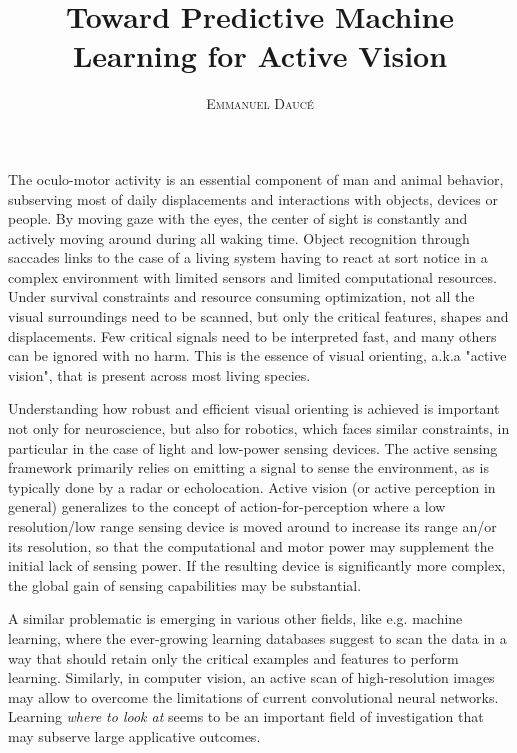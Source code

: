 \documentclass[12pt,twoside,openright]{article}
\title{\textbf{Toward Predictive Machine Learning for Active Vision} }
\author{\textsc{Emmanuel Daucé}}%
\date{}
\begin{document}
	
\maketitle
	
	The oculo-motor activity is an essential component of man and animal behavior, subserving most of daily displacements and interactions with objects, devices or people. By moving gaze with the eyes, the center of sight is constantly and actively moving around during all waking time.  %
	Object recognition through saccades links to the case of a living system having to react at sort notice in a complex environment with limited sensors and limited computational resources. Under survival constraints and resource consuming optimization, not all the visual surroundings need to be scanned, but only the critical features, shapes and displacements. Few critical signals need to be interpreted fast, and many others can be ignored with no harm. This is the essence of visual orienting, a.k.a "active vision", that is present across most living species.  
	
	Understanding how robust and efficient visual orienting is achieved is important not only for neuroscience, but also for robotics, which faces similar constraints, in particular in the case of light and low-power sensing devices.  The active sensing framework primarily relies on emitting a signal to sense the environment, as is typically done by a radar or echolocation. Active vision (or active perception in general) generalizes to the concept of action-for-perception where a low resolution/low range sensing device is moved around to increase its range an/or its resolution, so that the computational and motor power may supplement the initial lack of sensing power. {\color{magenta} If the resulting device is significantly more complex, the global gain of sensing capabilities may be substantial.}
	  
	A similar problematic is emerging in various other fields, like e.g. machine learning, where the ever-growing  learning databases suggest to scan the data in a way that should retain only the critical examples and features to perform learning. Similarly, in computer vision, an active scan of high-resolution images may allow to overcome the limitations of current convolutional neural networks. Learning \emph{where to look at} seems to be an important field of investigation that may subserve large applicative outcomes.
	
\end{document}
